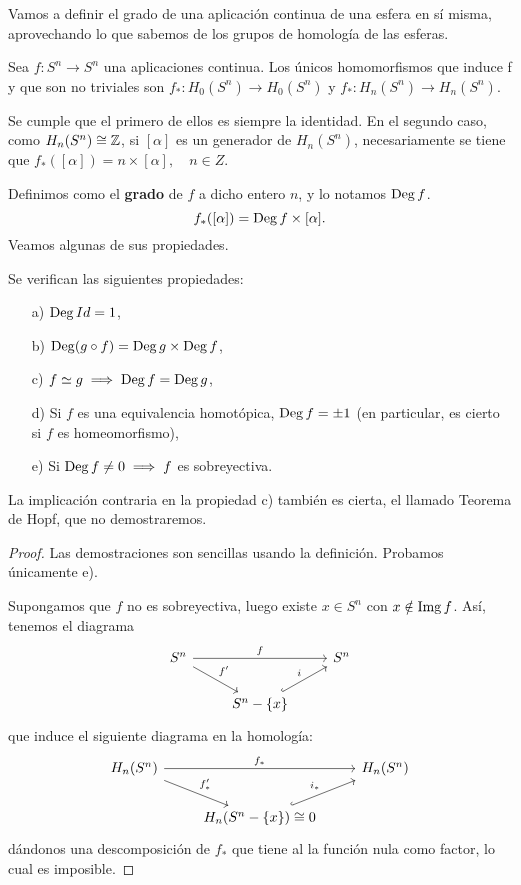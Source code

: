 Vamos a definir el grado de una aplicación continua de una esfera en sí misma, aprovechando lo que sabemos
de los grupos de homología de las esferas.

Sea $f \colon S^n \to S^n$ una aplicaciones continua. Los únicos homomorfismos que induce f y que son no triviales son
$f_* \colon H_0(S^n) \to H_0(S^n)$ y $f_* \colon H_n(S^n) \to H_n(S^n)$.

Se cumple que el primero de ellos es siempre la identidad. En el segundo caso, como $H_n(S^n) \cong \mathbb{Z}$, si $[\alpha]$ es un
generador de $H_n(S^n)$, necesariamente se tiene que $f_*([\alpha]) = n \times [\alpha], \quad n \in Z$.

Definimos como el \textbf{grado} de $f$ a dicho entero $n$, y lo notamos $\operatorname{Deg} f$.
\[ f_*([\alpha]) = \operatorname{Deg} f \times [\alpha]. \]
Veamos algunas de sus propiedades.

\begin{proposition}[Propiedades]
  Se verifican las siguientes propiedades:
  \begin{itemize}
    \item[a)] $\operatorname{Deg} Id = 1$,
    \item[b)] $\operatorname{Deg} (g \circ f) = \operatorname{Deg} g \times \operatorname{Deg} f$,
    \item[c)] $f \simeq g \implies \operatorname{Deg} f = \operatorname{Deg} g$,
    \item[d)] Si $f$ es una equivalencia homotópica, $\operatorname{Deg} f = \pm 1$ (en particular, es cierto si $f$ es homeomorfismo),
    \item[e)] Si $\operatorname{Deg} f \neq 0 \implies f$ es sobreyectiva.
  \end{itemize}
  La implicación contraria en la propiedad c) también es cierta, el llamado Teorema de Hopf, que no demostraremos.
\end{proposition}

\begin{proof}
  Las demostraciones son sencillas usando la definición. Probamos únicamente e).

  Supongamos que $f$ no es sobreyectiva, luego existe $x \in S^n$ con $x \notin \operatorname{Img} f$. Así, tenemos el diagrama
  \[ \begin{tikzcd}
    S^n  \arrow{dr}{f'} \arrow{rr}{f} & & S^n  \\
    & S^n - \{x\} \arrow[hookrightarrow]{ur}{i}
  \end{tikzcd} \]
  que induce el siguiente diagrama en la homología:
  \[ \begin{tikzcd}
    H_n(S^n)  \arrow{dr}{f'_*} \arrow{rr}{f_*} & & H_n(S^n)  \\
    & H_n(S^n - \{x\}) \cong 0 \arrow[hookrightarrow]{ur}{i_*}
  \end{tikzcd} \]
  dándonos una descomposición de $f_*$ que tiene al la función nula como factor, lo cual es imposible.
\end{proof}

